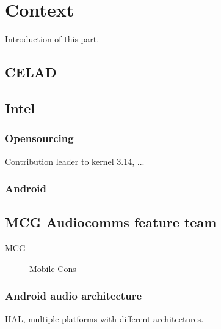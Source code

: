 \chapter{Context}

Introduction of this part.

\section{CELAD}

\section{Intel}
\subsection{Opensourcing}
Contribution leader to kernel 3.14, ...

\subsection{Android}

\section{MCG Audiocomms feature team}
\begin{description}
    \item[MCG] Mobile Cons
\end{description}

\subsection{Android audio architecture}
\label{sec:parameter-framework}
HAL, multiple platforms with different architectures.

